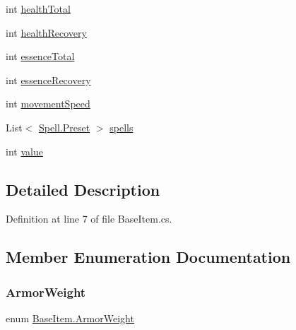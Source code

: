 \begin{DoxyCompactItemize}
int \mbox{\hyperlink{class_base_item_acccd778e1b1e14d3820b4d74d71bf1df}{health\+Total}}
\item 
int \mbox{\hyperlink{class_base_item_acb3bb8b3a0f0d7ae56d7f46216bcf4d5}{health\+Recovery}}
\item 
int \mbox{\hyperlink{class_base_item_a6f4e6b8312eda49aac9073e42ee19032}{essence\+Total}}
\item 
int \mbox{\hyperlink{class_base_item_a47d64c0e1e672c7e26191d82ecb1c639}{essence\+Recovery}}
\item 
int \mbox{\hyperlink{class_base_item_a82385b5a578c53ce385d30468d7931c7}{movement\+Speed}}
\item 
List$<$ \mbox{\hyperlink{class_spell_a5520e850e7000a6156b3456672b72ed1}{Spell.\+Preset}} $>$ \mbox{\hyperlink{class_base_item_a00c4f617eb916f07056fe641f67e27ee}{spells}}
\item 
int \mbox{\hyperlink{class_base_item_ac246c2f3f1b1b6e3cae9bef5c26268a2}{value}}
\end{DoxyCompactItemize}


\subsection{Detailed Description}


Definition at line 7 of file Base\+Item.\+cs.



\subsection{Member Enumeration Documentation}
\mbox{\label{class_base_item_a80a37ded5df56d13609012ee892de9dc}} 
\subsubsection{\texorpdfstring{ArmorWeight}{ArmorWeight}}
{\footnotesize\ttfamily enum \mbox{\hyperlink{class_base_item_a80a37ded5df56d13609012ee892de9dc}{Base\+Item.\+Armor\+Weight}}\hspace{0.3cm}{\ttfamily [strong]}}

